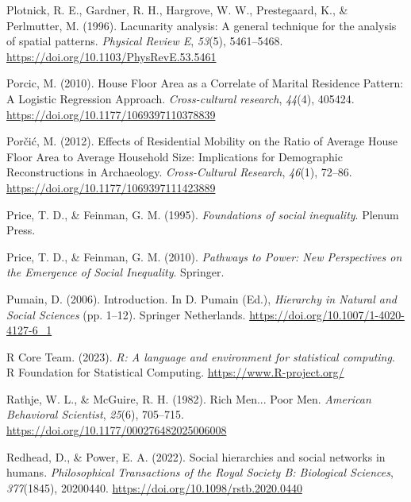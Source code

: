 \documentclass[
  12pt,
]{book}
\newlength{\cslhangindent}
\newlength{\cslentryspacingunit} %
\newenvironment{CSLReferences}[2] %
 {%
  \setlength{\parindent}{0pt}
  \ifodd #1
  \let\oldpar\par
  \def\par{\hangindent=\cslhangindent\oldpar}
  \fi
  \setlength{\parskip}{#2\cslentryspacingunit}
 }%
 {}
\begin{document}
\begin{CSLReferences}{1}{0}
\leavevmode{}%
Plotnick, R. E., Gardner, R. H., Hargrove, W. W., Prestegaard, K., \& Perlmutter, M. (1996). Lacunarity analysis: A general technique for the analysis of spatial patterns. \emph{Physical Review E}, \emph{53}(5), 5461--5468. \url{https://doi.org/10.1103/PhysRevE.53.5461}

\leavevmode{}%
Porcic, M. (2010). House Floor Area as a Correlate of Marital Residence Pattern: A Logistic Regression Approach. \emph{Cross-cultural research}, \emph{44}(4), 405424. \url{https://doi.org/10.1177/1069397110378839}

\leavevmode{}%
Porčić, M. (2012). Effects of Residential Mobility on the Ratio of Average House Floor Area to Average Household Size: Implications for Demographic Reconstructions in Archaeology. \emph{Cross-Cultural Research}, \emph{46}(1), 72--86. \url{https://doi.org/10.1177/1069397111423889}

\leavevmode{}%
Price, T. D., \& Feinman, G. M. (1995). \emph{Foundations of social inequality}. Plenum Press.

\leavevmode{}%
Price, T. D., \& Feinman, G. M. (2010). \emph{Pathways to Power: New Perspectives on the Emergence of Social Inequality}. Springer.

\leavevmode{}%
Pumain, D. (2006). Introduction. In D. Pumain (Ed.), \emph{Hierarchy in {Natural} and {Social Sciences}} (pp. 1--12). {Springer Netherlands}. \url{https://doi.org/10.1007/1-4020-4127-6_1}

\leavevmode{}%
R Core Team. (2023). \emph{R: A language and environment for statistical computing}. R Foundation for Statistical Computing. \url{https://www.R-project.org/}

\leavevmode{}%
Rathje, W. L., \& McGuire, R. H. (1982). Rich Men... Poor Men. \emph{American Behavioral Scientist}, \emph{25}(6), 705--715. \url{https://doi.org/10.1177/000276482025006008}

\leavevmode{}%
Redhead, D., \& Power, E. A. (2022). Social hierarchies and social networks in humans. \emph{Philosophical Transactions of the Royal Society B: Biological Sciences}, \emph{377}(1845), 20200440. \url{https://doi.org/10.1098/rstb.2020.0440}


\end{CSLReferences}
\end{document}
